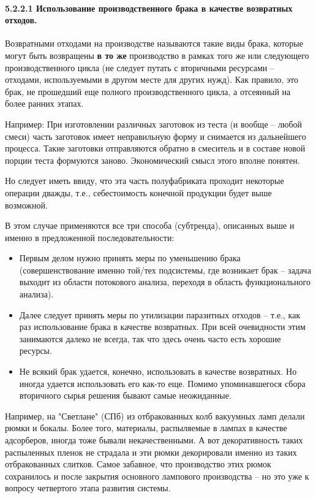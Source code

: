 \documentclass[a4paper,11pt]{article}
\begin{document}
\paragraph{5.2.2.1 Использование производственного брака в качестве возвратных 
  отходов.}

Возвратными отходами на производстве называются такие виды брака, которые
могут быть возвращены \textbf{в то же} производство в рамках того же или
следующего производственного цикла (не следует путать с вторичными ресурсами
-- отходами, используемыми в другом месте для других нужд). Как правило, это
брак, не прошедший еще полного производственного цикла, а отсеянный на более
ранних этапах.

Например: При изготовлении различных заготовок из теста (и вообще -- любой
смеси) часть заготовок имеет неправильную форму и снимается из дальнейшего
процесса. Такие заготовки отправляются обратно в смеситель и в составе новой
порции теста формуются заново. Экономический смысл этого вполне понятен.

Но следует иметь ввиду, что эта часть полуфабриката проходит некоторые
операции дважды, т.е., себестоимость конечной продукции будет выше возможной.

В этом случае применяются все три способа (субтренда), описанных выше и именно
в предложенной последовательности:
\begin{itemize}
\item Первым делом нужно принять меры по уменьшению брака (совершенствование
  именно той/тех подсистемы, где возникает брак -- задача выходит из области
  потокового анализа, переходя в область функционального анализа).
\item Далее следует принять меры по утилизации паразитных отходов -- т.е., как
  раз использование брака в качестве возвратных. При всей очевидности этим
  занимаются далеко не всегда, так что здесь очень часто есть хорошие ресурсы.
\item Не всякий брак удается, конечно, использовать в качестве возвратных. Но
  иногда удается использовать его как-то еще. Помимо упоминавшегося сбора
  вторичного сырья решения бывают самые неожиданные.
\end{itemize}
Например, на "Светлане" (СПб) из отбракованных колб вакуумных ламп делали
рюмки и бокалы. Более того, материалы, распыляемые в лампах в качестве
адсорберов, иногда тоже бывали некачественными. А вот декоративность таких
распыленных пленок не страдала и эти рюмки декорировали именно из таких
отбракованных слитков. Самое забавное, что производство этих рюмок сохранилось
и после закрытия основного лампового производства -- но это уже к вопросу
четвертого этапа развития системы.
\end{document}
